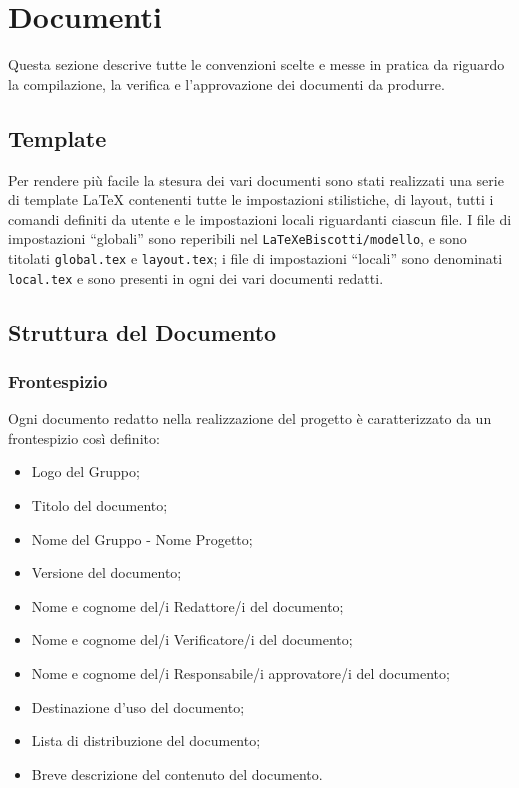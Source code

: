 \section{Documenti}
Questa sezione descrive tutte le convenzioni scelte e messe in pratica da \GroupName{} riguardo la compilazione, la verifica e l'approvazione dei documenti da produrre.

\subsection{Template}

Per rendere più facile la stesura dei vari documenti sono stati realizzati una serie di template \LaTeX{} contenenti tutte le impostazioni stilistiche, di layout, tutti i comandi definiti da utente e le impostazioni locali riguardanti ciascun file. I file di impostazioni “globali” sono reperibili nel  \texttt{LaTeXeBiscotti/modello}, e sono titolati \texttt{global.tex} e \texttt{layout.tex}; i file di impostazioni “locali” sono denominati \texttt{local.tex} e sono presenti in ogni  dei vari documenti redatti.

\subsection{Struttura del Documento}
\subsubsection{Frontespizio}
Ogni documento redatto nella realizzazione del progetto è caratterizzato da un frontespizio così definito:
\begin{itemize}
\item Logo del Gruppo;
\item Titolo del documento;
\item Nome del Gruppo - Nome Progetto;
\item Versione del documento;
\item Nome e cognome del/i Redattore/i del documento;
\item Nome e cognome del/i Verificatore/i del documento;
\item Nome e cognome del/i Responsabile/i approvatore/i del documento;
\item Destinazione d'uso del documento;
\item Lista di distribuzione del documento;
\item Breve descrizione del contenuto del documento.
\end{itemize}

